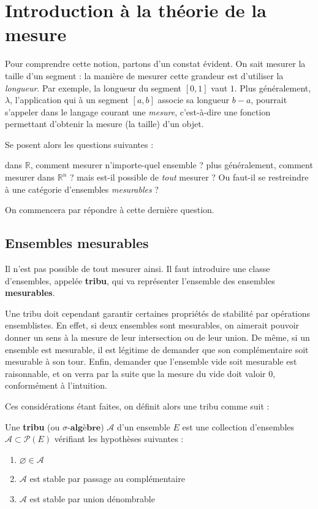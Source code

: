 \documentclass[../integ-proba.tex]{subfiles}
\begin{document}
  \chapter{Introduction à la théorie de la mesure}

  Pour comprendre cette notion, partons d'un constat évident.
  On sait mesurer la taille d'un segment : la manière de mesurer cette grandeur est d'utiliser la \textit{longueur}.
  Par exemple, la longueur du segment $\left[0,1\right]$ vaut $1$.
  Plus généralement, $\lambda$, l'application qui à un segment $\left[a,b\right]$ associe sa longueur $b-a$, pourrait s'appeler dans le langage courant une \textit{mesure}, c'est-à-dire une fonction permettant d'obtenir la mesure (la taille) d'un objet.

  Se posent alors les questions suivantes :
  \begin{itemize}
    \itemb dans $\mathbb{R}$, comment mesurer n'importe-quel ensemble ?
    \itemb plus généralement, comment mesurer dans $\mathbb{R}^n$ ?
    \itemb mais est-il possible de \textit{tout} mesurer ?
    Ou faut-il se restreindre à une catégorie d'ensembles \textit{mesurables} ?
  \end{itemize}

  On commencera par répondre à cette dernière question.

  \section{Ensembles mesurables}

  Il n'est pas possible de tout mesurer ainsi.
  Il faut introduire une classe d'ensembles, appelée \textbf{tribu}, qui va représenter l'ensemble des ensembles \textbf{mesurables}.

  Une tribu doit cependant garantir certaines propriétés de stabilité par opérations ensemblistes.
  En effet, si deux ensembles sont mesurables, on aimerait pouvoir donner un sens à la mesure de leur intersection ou de leur union.
  De même, si un ensemble est mesurable, il est légitime de demander que son complémentaire soit mesurable à son tour.
  Enfin, demander que l'ensemble vide soit mesurable est raisonnable, et on verra par la suite que la mesure du vide doit valoir $0$, conformément à l'intuition.

  Ces considérations étant faites, on définit alors une tribu comme suit :

  \begin{defi}
    Une \textbf{tribu} (ou $\sigma\textbf{-algèbre}$) $\mathcal{A}$ d'un ensemble $E$ est une collection d'ensembles $\mathcal{A} \subset \mathcal{P}(E)$ vérifiant les hypothèses suivantes :
    \begin{enumerate}
      \item $\varnothing \in \mathcal{A}$
      \item $\mathcal{A}$ est stable par passage au complémentaire
      \item $\mathcal{A}$ est stable par union dénombrable
    \end{enumerate}
  \end{defi}
\end{document}
